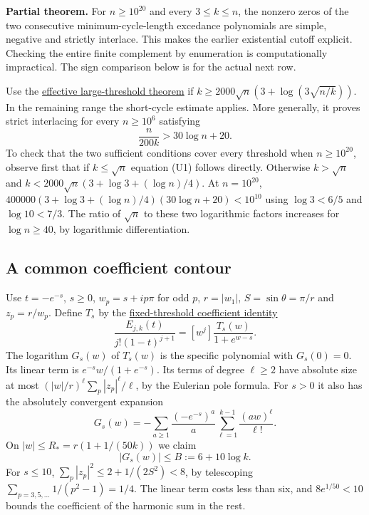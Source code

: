\textbf{Partial theorem.} For $n\ge10^{20}$ and every $3\le k\le n$, the nonzero zeros of the two consecutive minimum-cycle-length excedance polynomials are simple, negative and strictly interlace. This makes the earlier existential cutoff explicit. Checking the entire finite complement by enumeration is computationally impractical. The sign comparison below is for the actual next row.

Use the \href{https://github.com/ProgramComputer/open-math-research/blob/main/topics/long-cycle-excedances/effective-threshold.md}{effective large-threshold theorem} if $k\ge2000\sqrt n(3+\log(3\sqrt{n/k}))$. In the remaining range the short-cycle estimate applies. More generally, it proves strict interlacing for every $n\ge10^6$ satisfying
\[
\frac n{200k}>30\log n+20. \tag{U1}
\]
To check that the two sufficient conditions cover every threshold when $n\ge10^{20}$, observe first that if $k\le\sqrt n$ equation (U1) follows directly. Otherwise $k>\sqrt n$ and $k<2000\sqrt n(3+\log 3+(\log n)/4)$. At $n=10^{20}$, $400000(3+\log3+(\log n)/4)(30\log n+20)<10^{10}$ using $\log 3<6/5$ and $\log10<7/3$. The ratio of $\sqrt n$ to these two logarithmic factors increases for $\log n\ge40$, by logarithmic differentiation.

\subsection{A common coefficient contour}

Use $t=-e^{-s}$, $s\ge0$, $w_p=s+ip\pi$ for odd $p$, $r=|w_1|$, $S=\sin\theta=\pi/r$ and $z_p=r/w_p$. Define $T_s$ by the \href{https://github.com/ProgramComputer/open-math-research/blob/main/topics/long-cycle-excedances/fixed-threshold.md}{fixed-threshold coefficient identity}
\[
\frac{E_{j,k}(t)}{j!(1-t)^{j+1}}=[w^j]\frac{T_s(w)}{1+e^{w-s}}.
\]
The logarithm $G_s(w)$ of $T_s(w)$ is the specific polynomial with $G_s(0)=0$. Its linear term is $e^{-s}w/(1+e^{-s})$. Its terms of degree $\ell\ge2$ have absolute size at most $(|w|/r)^\ell\sum_p|z_p|^\ell/\ell$, by the Eulerian pole formula. For $s>0$ it also has the absolutely convergent expansion
\[
G_s(w)=-\sum_{a\ge1}\frac{(-e^{-s})^a}{a}\sum_{\ell=1}^{k-1}\frac{(aw)^\ell}{\ell!}.
\]
On $|w|\le R_*=r(1+1/(50k))$ we claim
\[
|G_s(w)|\le B:=6+10\log k . \tag{U2}
\]
For $s\le10$, $\sum_p|z_p|^2\le2+1/(2S^2)<8$, by telescoping $\sum_{p=3,5,\dots}1/(p^2-1)=1/4$. The linear term costs less than six, and $8e^{1/50}<10$ bounds the coefficient of the harmonic sum in the rest.

